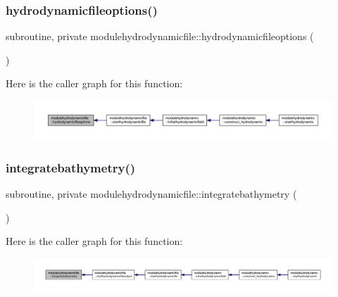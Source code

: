 \subsubsection{\texorpdfstring{hydrodynamicfileoptions()}{hydrodynamicfileoptions()}}
{\footnotesize\ttfamily subroutine, private modulehydrodynamicfile\+::hydrodynamicfileoptions (\begin{DoxyParamCaption}{ }\end{DoxyParamCaption})\hspace{0.3cm}{\ttfamily [private]}}

Here is the caller graph for this function\+:\nopagebreak
\begin{figure}[H]
\begin{center}
\leavevmode
\includegraphics[width=350pt]{namespacemodulehydrodynamicfile_a091307ffd36898af46af80552e9243ab_icgraph}
\end{center}
\end{figure}
\mbox{\label{namespacemodulehydrodynamicfile_ae3afcd841fecf4aa1c250de0db5419e7}} 
\subsubsection{\texorpdfstring{integratebathymetry()}{integratebathymetry()}}
{\footnotesize\ttfamily subroutine, private modulehydrodynamicfile\+::integratebathymetry (\begin{DoxyParamCaption}{ }\end{DoxyParamCaption})\hspace{0.3cm}{\ttfamily [private]}}

Here is the caller graph for this function\+:\nopagebreak
\begin{figure}[H]
\begin{center}
\leavevmode
\includegraphics[width=350pt]{namespacemodulehydrodynamicfile_ae3afcd841fecf4aa1c250de0db5419e7_icgraph}
\end{center}
\end{figure}
\mbox{\label{namespacemodulehydrodynamicfile_a567935da3a6ce143ef24e8bb5f4787ea}} 
